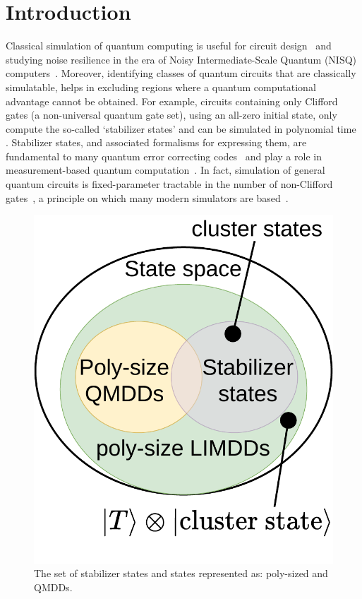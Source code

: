 

\vspace{-1em}
\section{Introduction~\label{sec:introduction}}


Classical simulation of quantum computing is useful for circuit design~\cite{zulehner2017one} and studying noise resilience in the era of Noisy Intermediate-Scale Quantum (NISQ) computers~\cite{preskill2018quantum}.
Moreover, identifying classes of quantum circuits that are classically simulatable, helps in excluding regions where a quantum computational advantage cannot be obtained.
For example, circuits containing only Clifford gates (a non-universal quantum gate set), using an all-zero initial state, only compute the so-called `stabilizer states' and can be simulated in polynomial time
\cite{gottesman1998heisenberg,aaronson2008improved,gottesman1997stabilizer}.
Stabilizer states, and associated formalisms for expressing them, are fundamental to many quantum error correcting codes~\cite{gottesman1997stabilizer} and play a role in measurement-based quantum computation~\cite{raussendorf2001oneway}.
In fact, simulation of general quantum circuits is fixed-parameter tractable in the number of non-Clifford gates~\cite{bravyi2016trading}, a principle on which many modern simulators are based~\cite{bravyi2016trading,bravyi2017improved,bravyi2019simulation, huang2019approximate,kocia2018stationary,kocia2020improved}.

\begin{figure}\vspace{-1.5em}
	\includegraphics[width=.24\textwidth]{pics/venn-diagram.pdf}
    \centering
    \vspace{-1em}
	\caption{
        The set of stabilizer states and states represented as:
        poly-sized \limdds and QMDDs.
        \vspace{-\baselineskip}
	}%
    \label{fig:venn-diagram} 
\end{figure}

